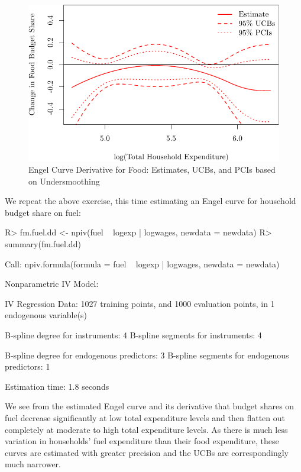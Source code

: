 \documentclass[
]{jss}
\begin{document}
\begin{figure}
\centering
\includegraphics{npiv_files/figure-latex/food-det-deriv-1.pdf}
\caption{Engel Curve Derivative for Food: Estimates, UCBs, and PCIs
based on Undersmoothing}
\end{figure}

We repeat the above exercise, this time estimating an Engel curve for
household budget share on fuel:

\begin{CodeChunk}
\begin{CodeInput}
R> fm.fuel.dd <- npiv(fuel ~ logexp | logwages, newdata = newdata)
R> summary(fm.fuel.dd)
\end{CodeInput}
\begin{CodeOutput}
Call:
npiv.formula(formula = fuel ~ logexp | logwages, newdata = newdata)

Nonparametric IV Model:

IV Regression Data: 1027 training points, and 1000 evaluation points, in 1 endogenous variable(s)

B-spline degree for instruments:             4
B-spline segments for instruments:           4

B-spline degree for endogenous predictors:   3
B-spline segments for endogenous predictors: 1

Estimation time: 1.8 seconds
\end{CodeOutput}
\end{CodeChunk}

We see from the estimated Engel curve and its derivative that budget
shares on fuel decrease significantly at low total expenditure levels
and then flatten out completely at moderate to high total expenditure
levels. As there is much less variation in households' fuel expenditure
than their food expenditure, these curves are estimated with greater
precision and the UCBs are correspondingly much narrower.
\end{document}
